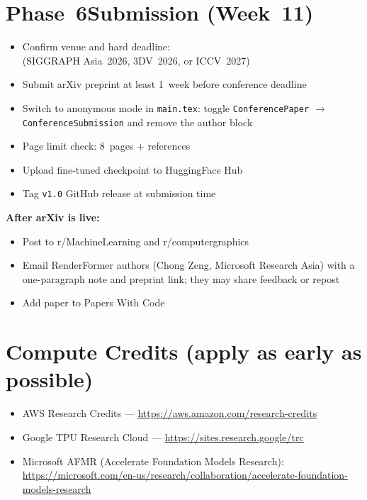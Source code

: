 \documentclass[11pt,a4paper]{article}
\newcommand{\sq}{\item[$\square$]}
\begin{document}
\section{Phase~6\quad Submission \textnormal{(Week~11)}}

\begin{itemize}[leftmargin=1.8em, itemsep=2pt]
  \sq Confirm venue and hard deadline: \underline{\hspace{5cm}}\\
      (SIGGRAPH Asia~2026, 3DV~2026, or ICCV~2027)
  \sq Submit arXiv preprint at least 1~week before conference deadline
  \sq Switch to anonymous mode in \texttt{main.tex}: toggle
      \texttt{ConferencePaper} $\to$ \texttt{ConferenceSubmission}
      and remove the author block
  \sq Page limit check: 8~pages + references
  \sq Upload fine-tuned checkpoint to HuggingFace Hub
  \sq Tag \texttt{v1.0} GitHub release at submission time
\end{itemize}

\noindent\textbf{After arXiv is live:}
\begin{itemize}[leftmargin=1.8em, itemsep=2pt]
  \sq Post to r/MachineLearning and r/computergraphics
  \sq Email RenderFormer authors (Chong Zeng, Microsoft Research Asia) with a
      one-paragraph note and preprint link; they may share feedback or repost
  \sq Add paper to Papers With Code
\end{itemize}

\section{Compute Credits (apply as early as possible)}

\begin{itemize}[leftmargin=1.8em, itemsep=2pt]
  \item AWS Research Credits ---
        \url{https://aws.amazon.com/research-credits}
  \item Google TPU Research Cloud ---
        \url{https://sites.research.google/trc}
  \item Microsoft AFMR (Accelerate Foundation Models Research):\\
        {\footnotesize\url{https://microsoft.com/en-us/research/collaboration/accelerate-foundation-models-research}}
\end{itemize}

\end{document}
